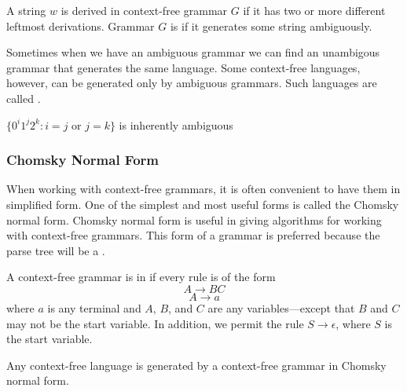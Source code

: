 \documentclass{article}
\begin{document}
\begin{definition}
  A string $w$ is derived  in context-free grammar $G$ if it has two or more different leftmost derivations. Grammar $G$ is  if it generates some string ambiguously. 
\end{definition}

Sometimes when we have an ambiguous grammar we can find an unambigous grammar that generates the same language. Some context-free languages, however, can be generated only by ambiguous grammars. Such languages are called . 

\begin{example}
  $\{0^i 1^j 2^k : i=j \textrm{ or } j=k\}$ is inherently ambiguous
\end{example}

\subsubsection{Chomsky Normal Form}

When working with context-free grammars, it is often convenient to have them in simplified form. One of the simplest and most useful forms is called the Chomsky normal form. Chomsky normal form is useful in giving algorithms for working with context-free grammars. This form of a grammar is preferred because the parse tree will be a . 

\begin{definition}
  A context-free grammar is in  if every rule is of the form $$A \rightarrow BC$$ $$A \rightarrow a$$ where $a$ is any terminal and $A$, $B$, and $C$ are any variables---except that $B$ and $C$ may not be the start variable. In addition, we permit the rule $S \rightarrow \epsilon$, where $S$ is the start variable. 
\end{definition}

\begin{theorem}
  Any context-free language is generated by a context-free grammar in Chomsky normal form.
\end{theorem}
\end{document}
